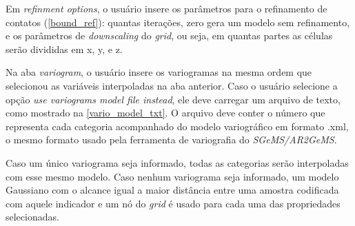 Em \textit{refinment options}, o usuário insere os parâmetros para o refinamento de contatos (\autoref{bound_ref}): quantas iterações, zero gera um modelo sem refinamento, e os parâmetros de \textit{downscaling} do \textit{grid}, ou seja, em quantas partes as células serão divididas em x, y, e z.

Na aba \textit{variogram}, o usuário insere os variogramas na mesma ordem que selecionou as variáveis interpoladas na aba anterior. Caso o usuário selecione a opção \textit{use variograms model file instead}, ele deve carregar um arquivo de texto, como mostrado na \autoref{vario_model_txt}. O arquivo deve conter o número que representa cada categoria acompanhado do modelo variográfico em formato .xml, o mesmo formato usado pela ferramenta de variografia do \textit{SGeMS/AR2GeMS}.

Caso um único variograma seja informado, todas as categorias serão interpoladas com esse mesmo modelo. Caso nenhum variograma seja informado, um modelo Gaussiano com o alcance igual a maior distância entre uma amostra codificada com aquele indicador e um nó do \textit{grid} é usado para cada uma das propriedades selecionadas.

